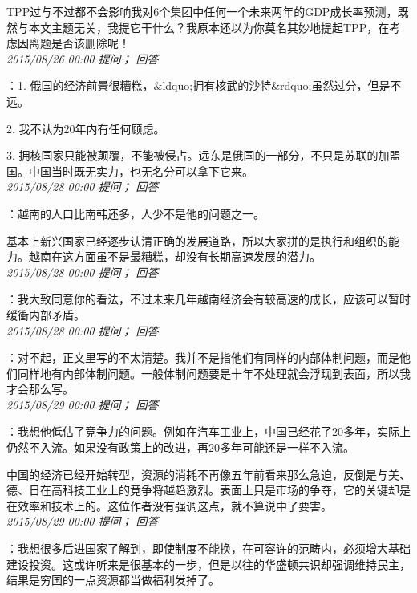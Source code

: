\documentclass[twocolumn]{ctexart}
\begin{document}
TPP过与不过都不会影响我对6个集团中任何一个未来两年的GDP成长率预测，既然与本文主题无关，我提它干什么？我原本还以为你莫名其妙地提起TPP，在考虑因离题是否该删除呢！\\

\textit{\hfill\noindent\small 2015/08/26 00:00 提问； 回答}

：1. 俄国的经济前景很糟糕，\&ldquo;拥有核武的沙特\&rdquo;虽然过分，但是不远。

2. 我不认为20年内有任何顾虑。

3. 拥核国家只能被颠覆，不能被侵占。远东是俄国的一部分，不只是苏联的加盟国。中国当时既无实力，也无名分可以拿下它来。\\

\textit{\hfill\noindent\small 2015/08/28 00:00 提问； 回答}

：越南的人口比南韩还多，人少不是他的问题之一。

基本上新兴国家已经逐步认清正确的发展道路，所以大家拼的是执行和组织的能力。越南在这方面虽不是最糟糕，却没有长期高速发展的潜力。\\

\textit{\hfill\noindent\small 2015/08/28 00:00 提问； 回答}

：我大致同意你的看法，不过未来几年越南经济会有较高速的成长，应该可以暂时缓衝内部矛盾。\\

\textit{\hfill\noindent\small 2015/08/28 00:00 提问； 回答}

：对不起，正文里写的不太清楚。我并不是指他们有同样的内部体制问题，而是他们同样地有内部体制问题。一般体制问题要是十年不处理就会浮现到表面，所以我才会那么写。\\

\textit{\hfill\noindent\small 2015/08/29 00:00 提问； 回答}

：我想他低估了竞争力的问题。例如在汽车工业上，中国已经花了20多年，实际上仍然不入流。如果没有政策上的改进，再20多年可能还是一样不入流。

中国的经济已经开始转型，资源的消耗不再像五年前看来那么急迫，反倒是与美、德、日在高科技工业上的竞争将越趋激烈。表面上只是市场的争夺，它的关键却是在效率和技术上的。这位作者没有强调这点，就不算说中了要害。\\

\textit{\hfill\noindent\small 2015/08/29 00:00 提问； 回答}

：我想很多后进国家了解到，即使制度不能换，在可容许的范畴内，必须增大基础建设投资。这或许听来是很基本的一步，但是以往的华盛顿共识却强调维持民主，结果是穷国的一点资源都当做福利发掉了。
\end{document}
